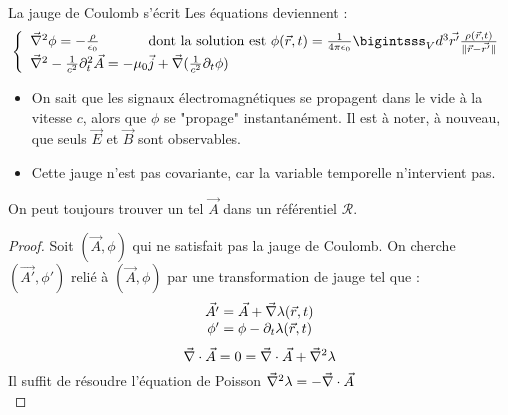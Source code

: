 	La jauge de Coulomb s'écrit 
	Les équations deviennent :
$$
	\left\{ \begin{array}{l}
		\nab^2\phi=-\frac{\rho}{\epsilon_0} \text{ \hspace{1cm} dont la solution est } \phi(\vec{r},t)=\frac{1}{4\pi\epsilon_0}\bigintsss_Vd^3\vec{r'}\frac{\rho(\vec{r},t)}{\parallel\vec{r}-\vec{r'}\parallel}\\
		\nab^2-\frac{1}{c^2}\partial_t^2\vec{A}=-\mu_0\vec{j}+\nab(\frac{1}{c^2}\partial_t\phi)	
	\end{array} \right.
$$
	
	\begin{remarks}
		\hspace{1pt}
		\begin{itemize}
			\item On sait que les signaux électromagnétiques se propagent dans le vide à la vitesse $c$, alors que $\phi$ se "propage" instantanément. Il est à noter, à nouveau, que seuls $\vec{E}$ et $\vec{B}$ sont observables.
			\item Cette jauge n'est pas covariante, car la variable temporelle n'intervient pas.
		\end{itemize}
	\end{remarks}
	
	\begin{theorem}
		On peut toujours trouver un tel $\vec{A}$ dans un référentiel $\mathcal{R}$.
	\end{theorem}
	
	\begin{proof}
		Soit $(\vec{A},\phi)$ qui ne satisfait pas la jauge de Coulomb. On cherche $(\vec{A'},\phi')$ relié à $(\vec{A},\phi)$ par une transformation de jauge tel que :
$$
		\begin{array}{r@{\;}l}
				\vec{A'} &=\vec{A}+\nab\lambda(\vec{r},t)\\
			\phi'&=\phi-\partial_t\lambda(\vec{r},t)
		\end{array}
$$
$$
		\vec{\nabla}\cdot\vec{A}=0=\vec{\nabla}\cdot\vec{A}+\vec{\nabla}^2\lambda
$$
	Il suffit de résoudre l'équation de Poisson $\vec{\nabla}^2\lambda=-\vec{\nabla}\cdot\vec{A}$ \\\qedhere
	\end{proof}
	

